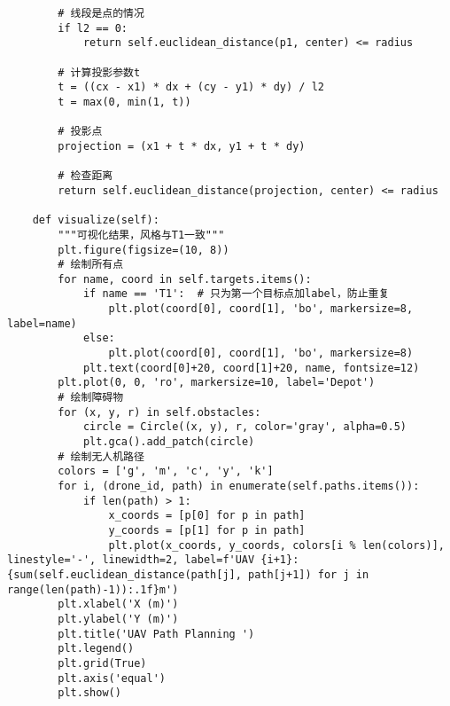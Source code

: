 \documentclass[12pt,fontset=adobe]{ctexart}
\begin{document}
\begin{verbatim}
        # 线段是点的情况
        if l2 == 0:
            return self.euclidean_distance(p1, center) <= radius
        
        # 计算投影参数t
        t = ((cx - x1) * dx + (cy - y1) * dy) / l2
        t = max(0, min(1, t))
        
        # 投影点
        projection = (x1 + t * dx, y1 + t * dy)
        
        # 检查距离
        return self.euclidean_distance(projection, center) <= radius
    
    def visualize(self):
        """可视化结果，风格与T1一致"""
        plt.figure(figsize=(10, 8))
        # 绘制所有点
        for name, coord in self.targets.items():
            if name == 'T1':  # 只为第一个目标点加label，防止重复
                plt.plot(coord[0], coord[1], 'bo', markersize=8, label=name)
            else:
                plt.plot(coord[0], coord[1], 'bo', markersize=8)
            plt.text(coord[0]+20, coord[1]+20, name, fontsize=12)
        plt.plot(0, 0, 'ro', markersize=10, label='Depot')
        # 绘制障碍物
        for (x, y, r) in self.obstacles:
            circle = Circle((x, y), r, color='gray', alpha=0.5)
            plt.gca().add_patch(circle)
        # 绘制无人机路径
        colors = ['g', 'm', 'c', 'y', 'k']
        for i, (drone_id, path) in enumerate(self.paths.items()):
            if len(path) > 1:
                x_coords = [p[0] for p in path]
                y_coords = [p[1] for p in path]
                plt.plot(x_coords, y_coords, colors[i % len(colors)], linestyle='-', linewidth=2, label=f'UAV {i+1}: {sum(self.euclidean_distance(path[j], path[j+1]) for j in range(len(path)-1)):.1f}m')
        plt.xlabel('X (m)')
        plt.ylabel('Y (m)')
        plt.title('UAV Path Planning ')
        plt.legend()
        plt.grid(True)
        plt.axis('equal')
        plt.show()
    

\end{verbatim}
\end{document}
